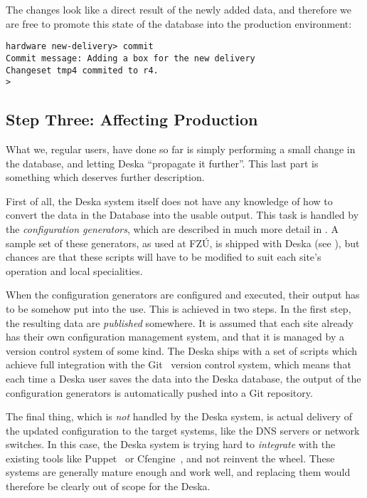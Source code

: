 \documentclass[deska]{subfiles}
\begin{document}
The changes look like a direct result of the newly added data, and therefore we are free to promote this state of the
database into the production environment:

\begin{verbatim}
hardware new-delivery> commit
Commit message: Adding a box for the new delivery
Changeset tmp4 commited to r4.
>
\end{verbatim}

\subsection{Step Three: Affecting Production}

What we, regular users, have done so far is simply performing a small change in the database, and letting Deska
``propagate it further''.  This last part is something which deserves further description.

First of all, the Deska system itself does not have any knowledge of how to convert the data in the Database into the
usable output.  This task is handled by the {\em configuration generators}, which are described in much more detail in
.  A sample set of these generators, as used at FZÚ, is shipped with Deska (see
), but chances are that these scripts will have to be modified to suit each site's operation and
local specialities.

When the configuration generators are configured and executed, their output has to be somehow put into the use.  This is
achieved in two steps.  In the first step, the resulting data are {\em published} somewhere.  It is assumed that each
site already has their own configuration management system, and that it is managed by a version control system of some
kind.  The Deska ships with a set of scripts which achieve full integration with the Git~\cite{git} version control
system, which means that each time a Deska user saves the data into the Deska database, the output of the configuration
generators is automatically pushed into a Git repository.

The final thing, which is {\em not} handled by the Deska system, is actual delivery of the updated configuration to the
target systems, like the DNS servers or network switches.  In this case, the Deska system is trying hard to {\em
integrate} with the existing tools like Puppet~\cite{puppet} or Cfengine~\cite{cfengine}, and not reinvent the wheel.
These systems are generally mature enough and work well, and replacing them would therefore be clearly out of scope for
the Deska.
\end{document}
